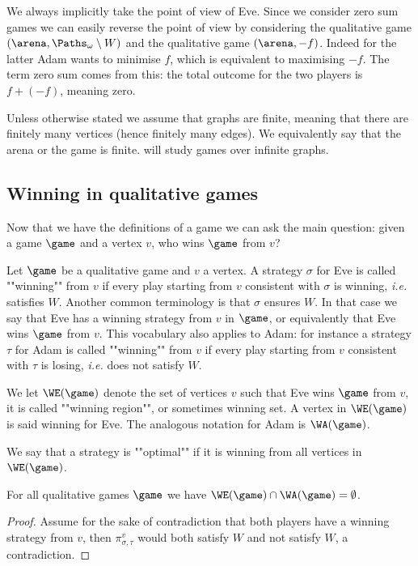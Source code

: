 We always implicitly take the point of view of Eve. 
Since we consider zero sum games we can easily reverse the point of view by considering the qualitative game 
$(\arena,\Paths_\omega \setminus W)$ and the qualitative game $(\arena,-f)$.
Indeed for the latter Adam wants to minimise $f$, which is equivalent to maximising $-f$.
The term zero sum comes from this: the total outcome for the two players is $f + (-f)$, meaning zero.

\begin{remark}
Unless otherwise stated we assume that graphs are finite, meaning that there are finitely many vertices (hence finitely many edges).
We equivalently say that the arena or the game is finite.
 will study games over infinite graphs.
\end{remark}

\subsection*{Winning in qualitative games}
Now that we have the definitions of a game we can ask the main question: 
given a game $\game$ and a vertex $v$, who wins $\game$ from $v$?

Let $\game$ be a qualitative game and $v$ a vertex.
A strategy $\sigma$ for Eve is called ""winning"" from $v$ if every play starting from $v$ consistent with $\sigma$ is winning, 
\textit{i.e.} satisfies $W$.
Another common terminology is that $\sigma$ ensures $W$.
In that case we say that Eve has a winning strategy from $v$ in $\game$, or equivalently that Eve wins $\game$ from $v$.
This vocabulary also applies to Adam: for instance 
a strategy $\tau$ for Adam is called ""winning"" from $v$ if every play starting from $v$ consistent with $\tau$ is losing, 
\textit{i.e.} does not satisfy $W$.

We let $\WE(\game)$ denote the set of vertices $v$ such that Eve wins $\game$ from $v$,
it is called ""winning region"", or sometimes winning set. 
A vertex in $\WE(\game)$ is said winning for Eve.
The analogous notation for Adam is $\WA(\game)$.

We say that a strategy is ""optimal"" if it is winning from all vertices in $\WE(\game)$.

\begin{fact}
\label{1-fact:winning_regions_disjoint}
For all qualitative games $\game$ we have $\WE(\game) \cap \WA(\game) = \emptyset$.
\end{fact}
\begin{proof}
Assume for the sake of contradiction that both players have a winning strategy from $v$, then $\pi^{v}_{\sigma,\tau}$
would both satisfy $W$ and not satisfy $W$, a contradiction.
\end{proof}

